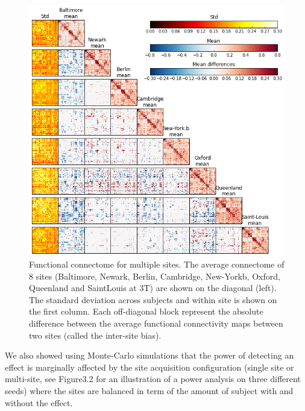 \documentclass[authoryear]{elsarticle}
\begin{document}
\begin{figure}[H!]
\begin{center}
\includegraphics[width=\linewidth]{../figures/connectome_multisite.png}
\end{center}
\caption[Connectome variability across sites]{
Functional connectome for multiple sites. The average connectome of 8 sites (Baltimore, Newark, Berlin, Cambridge, New-Yorkb, Oxford, Queenland and SaintLouis at 3T) are shown on the diagonal (left). The standard deviation across subjects and within site is shown on the first column. Each off-diagonal block represent the absolute difference between the average functional connectivity maps between two sites (called the inter-site bias).
}
\label{fig_connectome_variability}
\end{figure}


We also showed using Monte-Carlo simulations that the power of detecting an effect is marginally affected by the site acquisition configuration (single site or multi-site, see Figure3.2 for an illustration of a power analysis on three different seeds) where the sites are balanced in term of the amount of subject with and without the effect. 
\end{document}
